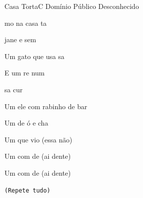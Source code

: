 \documentclass[a4,12pt,oneside]{book}
\newcommand{\RevDate}{\today}
\newcommand{\NotCCLIed}{\relax}
\renewcommand{\SBPubDom}{Domínio Público}
\begin{document}
\begin{song}{Casa Torta}{C}
  {\SBPubDom}
  {Desconhecido}
  {}
  {\NotCCLIed}
  
	\renewcommand{\RevDate}{02 de junho de 2015}
 
	\SBIntro[N]{}
	
	\ifChordBk	
	\vspace{-2em}\flushright{\Cchord \quad \Gschord \quad \Cschord \quad \Fchord
		\quad \GBchord \quad \Dmchord \quad \Amchord}
	\fi
	
	
	\begin{SBVerse*}
		 mo na casa ta
		
		 jane e sem 
		
		Um gato que  usa sa
		
		E  um re num 
		
		  
		
		 sa cur
		
		Um ele com rabinho de bar
		
		Um  de ó e cha
		
		Um  que  vio (essa não)
		
		Um  com  de  (ai  dente)

		Um  com  de  (ai  dente)
		
		{\small\texttt{(Repete tudo)}}
	\end{SBVerse*}
\end{song}
\end{document}
